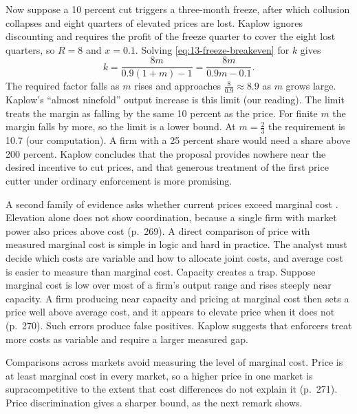 \begin{example}
Now suppose a 10 percent cut triggers a three-month freeze, after which collusion collapses and eight quarters of
elevated prices are lost. Kaplow ignores discounting and requires the profit of the freeze quarter to cover the
eight lost quarters, so $R = 8$ and $x = 0.1$. Solving \eqref{eq:13-freeze-breakeven} for $k$ gives
\begin{equation*}
  k = \frac{8m}{0.9(1 + m) - 1} = \frac{8m}{0.9m - 0.1} .
\end{equation*}
The required factor falls as $m$ rises and approaches $\frac{8}{0.9} \approx 8.9$ as $m$ grows large. Kaplow's
``almost ninefold'' output increase is this limit (our reading). The limit treats the margin as falling by the same
10 percent as the price. For finite $m$ the margin falls by more, so the limit is a lower bound. At
$m = \frac{2}{3}$ the requirement is 10.7 (our computation). A firm with a
25 percent share would need a share above 200 percent. Kaplow concludes that the proposal provides nowhere near the
desired incentive to cut prices, and that generous treatment of the first price cutter under ordinary enforcement
is more promising.
\end{example}

A second family of evidence asks whether current prices exceed marginal cost \citep[pp.~269--275]{Kaplow2013}.
Elevation alone does not show coordination, because a single firm with market power also prices above cost
(p.~269). A direct comparison of price with measured marginal cost is simple in logic and hard in practice. The
analyst must decide which costs are variable and how to allocate joint costs, and average cost is easier to
measure than marginal cost. Capacity creates a trap. Suppose marginal cost is low over most of a firm's output
range and rises steeply near capacity. A firm producing near capacity and pricing at marginal cost then sets a
price well above average cost, and it appears to elevate price when it does not (p.~270). Such errors produce
false positives. Kaplow suggests that enforcers treat more costs as variable and require a larger measured gap.

Comparisons across markets avoid measuring the level of marginal cost. Price is at least marginal cost in every
market, so a higher price in one market is supracompetitive to the extent that cost differences do not explain it
(p.~271). Price discrimination gives a sharper bound, as the next remark shows.


